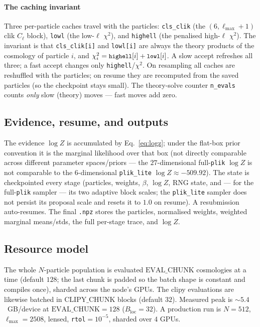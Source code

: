 \documentclass[11pt]{article}
\newcommand{\code}[1]{\texttt{\small #1}}
\newcommand{\file}[1]{\texttt{\small #1}}
\newcommand{\Cl}{C_\ell}
\newcommand{\chisq}{\chi^2}
\newcommand{\Lmax}{\ell_{\max}}
\newcommand{\Bloc}{B_{\mathrm{loc}}}
\begin{document}
\paragraph{The caching invariant}
Three per-particle caches travel with the particles: \code{cls\_clik}
(the $(6,\Lmax{+}1)$ clik $\Cl$ block), \code{lowl} (the low-$\ell$
$\chisq$), and \code{highell} (the penalised high-$\ell$ $\chisq$). The
invariant is that \code{cls\_clik[i]} and \code{lowl[i]} are always the
theory products of the cosmology of particle $i$, and
$\chisq_i=\code{highell}[i]+\code{lowl}[i]$. A slow accept refreshes all
three; a fast accept changes only \code{highell}/$\chisq$. On resampling
all caches are reshuffled with the particles; on resume they are
recomputed from the saved particles (so the checkpoint stays small). The
theory-solve counter \code{n\_evals} counts \emph{only} slow (theory)
moves --- fast moves add zero.

\subsection{Evidence, resume, and outputs}

The evidence $\log Z$ is accumulated by Eq.~\eqref{eq:logz}; under the
flat-box prior convention it is the marginal likelihood over that box
(not directly comparable across different parameter spaces/priors --- the
$27$-dimensional full-\code{plik} $\log Z$ is not comparable to the
$6$-dimensional \code{plik\_lite} $\log Z\approx-509.92$). The state is
checkpointed every stage (particles, weights, $\beta$, $\log Z$, RNG
state, and --- for the full-\code{plik} sampler --- its two adaptive block
scales; the \code{plik\_lite} sampler does not persist its proposal scale
and resets it to $1.0$ on resume). A resubmission auto-resumes. The final
\file{.npz} stores the particles, normalised weights, weighted marginal
means/stds, the full per-stage trace, and $\log Z$.

\subsection{Resource model}

The whole $N$-particle population is evaluated $\mathrm{EVAL\_CHUNK}$
cosmologies at a time (default $128$; the last chunk is padded so the
batch shape is constant and compiles once), sharded across the node's
GPUs. The clipy evaluations are likewise batched in $\mathrm{CLIPY\_CHUNK}$
blocks (default $32$). Measured peak is $\sim5.4$~GB/device at
$\mathrm{EVAL\_CHUNK}=128$ ($\Bloc=32$). A production run is $N=512$,
$\Lmax=2508$, lensed, \code{rtol}$=10^{-5}$, sharded over $4$ GPUs.
\end{document}
